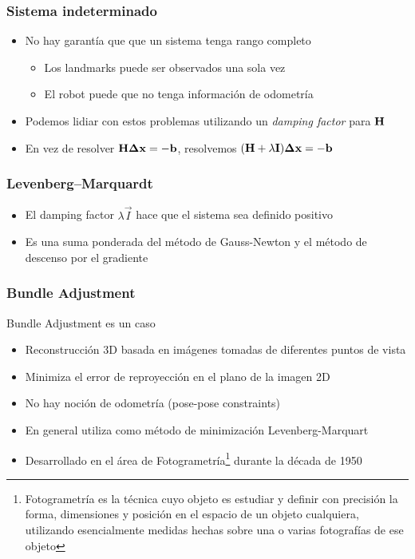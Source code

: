 \begin{frame}
    \frametitle{Sistema indeterminado}
    \begin{itemize}
		\item No hay garantía que que un sistema tenga rango completo
		\begin{itemize}
			\item Los landmarks puede ser observados una sola vez
			\item El robot puede que no tenga información de odometría
		\end{itemize}
		\item Podemos lidiar con estos problemas utilizando un \emph{damping factor} para $\boldsymbol{\mathbf{H}}$
		\item En vez de resolver $\boldsymbol{\mathbf{H}} \boldsymbol{\mathbf{\Delta}} \boldsymbol{\mathbf{x}} = - \boldsymbol{\mathbf{b}}$, resolvemos
		$(\boldsymbol{\mathbf{H}} + \lambda \boldsymbol{\mathbf{I}}) \boldsymbol{\mathbf{\Delta}} \boldsymbol{\mathbf{x}} = - \boldsymbol{\mathbf{b}}$
    \end{itemize}
\end{frame}

\begin{frame}
    \frametitle{Levenberg–Marquardt}
    \begin{itemize}
		\item El damping factor $\lambda \vec{I}$ hace que el sistema sea definido positivo
		\item Es una suma ponderada del método de Gauss-Newton y el método de descenso por el gradiente
    \end{itemize}
\end{frame}


\begin{frame}
    \frametitle{Bundle Adjustment}
    
    Bundle Adjustment es un caso
    
    \begin{itemize}
        \item Reconstrucción 3D basada en imágenes tomadas de diferentes puntos de vista
        \item Minimiza el error de reproyección en el plano de la imagen 2D
        \item No hay noción de odometría (pose-pose constraints)
        \item En general utiliza como método de minimización Levenberg-Marquart
        \item Desarrollado en el área de Fotogrametría\footnote{Fotogrametría es la técnica cuyo objeto es estudiar y definir con precisión la forma, dimensiones y posición en el espacio de un objeto cualquiera, utilizando esencialmente medidas hechas sobre una o varias fotografías de ese objeto} durante la década de 1950
    \end{itemize}
    
\end{frame}


